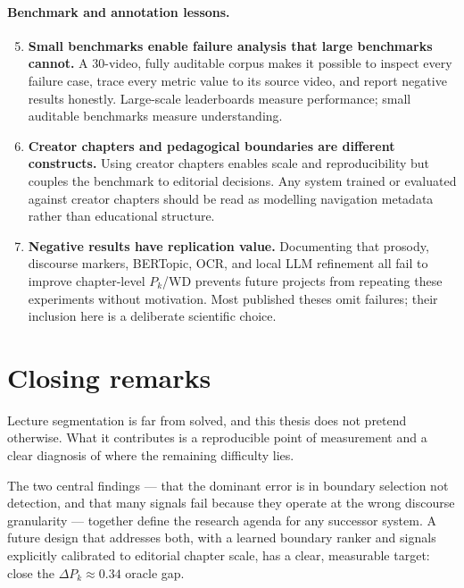 \paragraph{Benchmark and annotation lessons.}
\begin{enumerate}
  \setcounter{enumi}{4}
  \item \textbf{Small benchmarks enable failure analysis that large benchmarks
    cannot.}
    A 30-video, fully auditable corpus makes it possible to inspect every
    failure case, trace every metric value to its source video, and report
    negative results honestly.
    Large-scale leaderboards measure performance; small auditable benchmarks
    measure understanding.

  \item \textbf{Creator chapters and pedagogical boundaries are different
    constructs.}
    Using creator chapters enables scale and reproducibility but couples the
    benchmark to editorial decisions.
    Any system trained or evaluated against creator chapters should be read
    as modelling navigation metadata rather than educational structure.

  \item \textbf{Negative results have replication value.}
    Documenting that prosody, discourse markers, BERTopic, OCR, and local LLM
    refinement all fail to improve chapter-level $P_k$/WD prevents future
    projects from repeating these experiments without motivation.
    Most published theses omit failures; their inclusion here is a deliberate
    scientific choice.
\end{enumerate}

\section{Closing remarks}

Lecture segmentation is far from solved, and this thesis does not pretend
otherwise.
What it contributes is a reproducible point of measurement and a clear
diagnosis of where the remaining difficulty lies.

The two central findings --- that the dominant error is in boundary selection
not detection, and that many signals fail because they operate at the wrong
discourse granularity --- together define the research agenda for any
successor system.
A future design that addresses both, with a learned boundary ranker and
signals explicitly calibrated to editorial chapter scale, has a clear,
measurable target: close the $\Delta P_k \approx 0.34$ oracle gap.

